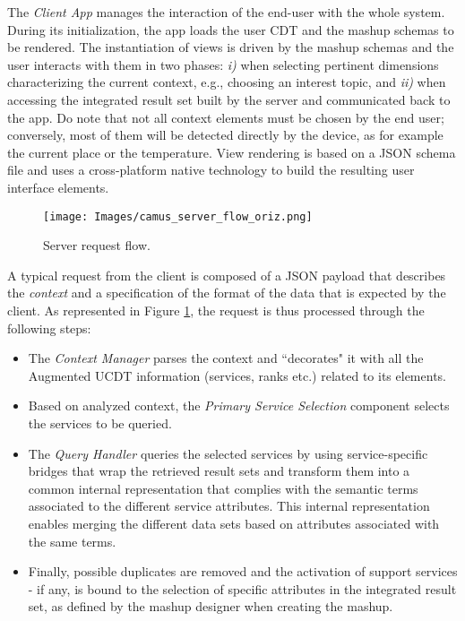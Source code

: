 The \emph{Client App} manages the interaction of the end-user with the whole
system. During its initialization, the app loads  the user CDT and the mashup schemas to be rendered.
The instantiation of views is driven by the mashup schemas and the user interacts
with them in two phases: \emph{i)} when selecting pertinent dimensions characterizing the current context, e.g.,
choosing an interest topic, and \emph{ii)} when accessing the integrated result set built by the server and communicated back to the app. Do note that not all context elements must be chosen by the end user; conversely, most of them will be detected directly by the device, as for example the current place or the temperature.
View rendering is based on a JSON schema file and uses a
cross-platform native technology
to build the resulting user interface elements.

%
\begin{figure} [t]
\centering
\texttt{[image: Images/camus\_server\_flow\_oriz.png]}
\caption{Server request flow.}
\label{fig:requestFlow}
\end{figure}
%

A typical request from the
client is composed of a JSON payload that describes the \emph{context}
and a specification of the  format of the data that is expected by the
client. As represented in Figure \ref{fig:requestFlow}, the request is thus processed through the following steps:

\begin{itemize}

\item The \emph{Context Manager} parses the context  and ``decorates" it with all the Augmented UCDT information (services, ranks etc.) related to its elements.

\item Based on analyzed context, the \emph{Primary Service Selection} component selects the services to be
queried.

\item The \emph{Query Handler} queries the
selected services by using service-specific bridges that wrap the retrieved result sets and transform them into a common internal representation that complies with the semantic terms associated to the different service attributes. This internal representation enables merging the different data sets based on attributes associated with the same terms.

\item Finally, possible duplicates are removed and the activation of support services - if any, is
bound to the selection of specific attributes in the integrated result set, as defined by the mashup designer when creating the mashup.

\end{itemize}



